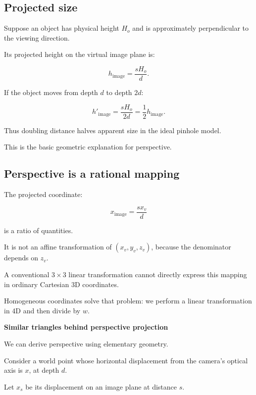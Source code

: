 \subsection{Projected size}\label{02-foundations-ii-ch033-projected-size}

\hypertarget{02-foundations-ii-ch033-projected-size}{}

Suppose an object has physical height \(H_o\) and is approximately perpendicular to the viewing direction.

Its projected height on the virtual image plane is:

\[
 \boxed{ h_{\mathrm{image}}=\frac{sH_o}{d} }.
\]

If the object moves from depth \(d\) to depth \(2d\):

\[
 h'_{\mathrm{image}} = \frac{sH_o}{2d} = \frac12h_{\mathrm{image}}.
\]

Thus doubling distance halves apparent size in the ideal pinhole model.

This is the basic geometric explanation for perspective.

\subsection{Perspective is a rational mapping}\label{02-foundations-ii-ch033-perspective-is-a-rational-mapping}

\hypertarget{02-foundations-ii-ch033-perspective-is-a-rational-mapping}{}

The projected coordinate:

\[
 x_{\mathrm{image}}=\frac{s x_v}{d}
\]

is a ratio of quantities.

It is not an affine transformation of \((x_v,y_v,z_v)\), because the denominator depends on \(z_v\).

A conventional \(3\times3\) linear transformation cannot directly express this mapping in ordinary Cartesian 3D coordinates.

Homogeneous coordinates solve that problem: we perform a linear transformation in 4D and then divide by \(w\).

\textbf{Similar triangles behind perspective projection}

We can derive perspective using elementary geometry.

Consider a world point whose horizontal displacement from the camera's optical axis is \(x\), at depth \(d\).

Let \(x_s\) be its displacement on an image plane at distance \(s\).

